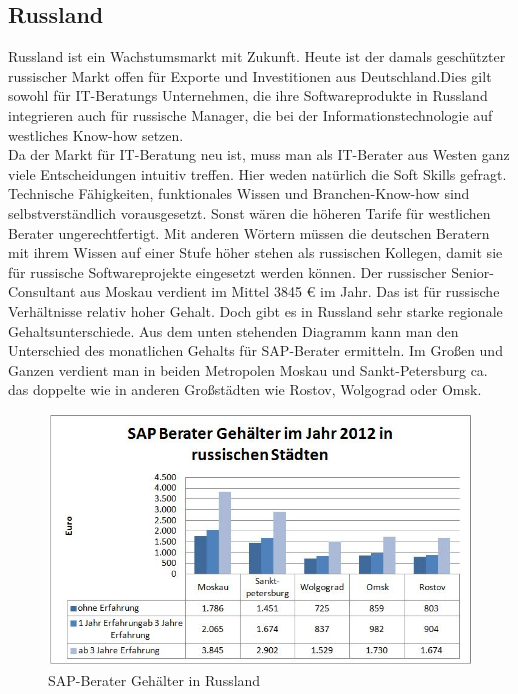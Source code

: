 	\subsection{Russland}
	Russland ist ein Wachstumsmarkt mit Zukunft. Heute ist der damals geschützter russischer Markt offen für Exporte und Investitionen aus Deutschland.Dies gilt sowohl für IT-Beratungs Unternehmen, die ihre Softwareprodukte in Russland integrieren auch für russische Manager, die bei der Informationstechnologie auf westliches Know-how setzen.\\
	Da der Markt für IT-Beratung neu ist, muss man als IT-Berater aus Westen ganz viele Entscheidungen intuitiv treffen. Hier weden natürlich die Soft Skills gefragt. Technische Fähigkeiten, funktionales Wissen und Branchen-Know-how sind selbstverständlich vorausgesetzt. Sonst wären die höheren Tarife für westlichen Berater ungerechtfertigt. Mit anderen Wörtern müssen die deutschen Beratern mit ihrem Wissen auf einer Stufe höher stehen als russischen Kollegen, damit sie für russische Softwareprojekte eingesetzt werden können. 
	Der russischer Senior-Consultant aus Moskau verdient im Mittel 3845 € im Jahr. Das ist für russische Verhältnisse relativ hoher Gehalt. Doch gibt es in Russland sehr starke regionale Gehaltsunterschiede. Aus dem unten stehenden Diagramm kann man den Unterschied des monatlichen 
	Gehalts für SAP-Berater ermitteln. Im Großen und Ganzen verdient man in beiden Metropolen Moskau und Sankt-Petersburg ca. das doppelte wie in anderen Großstädten wie Rostov, Wolgograd oder Omsk.
	\\
\begin{figure}[htp]
\centering
\includegraphics[width=0.7\linewidth]{./images/SAP-Berater_Gehalt_RU}
\caption{SAP-Berater Gehälter in Russland}
\label{fig:SAP-Berater_Gehalt_RU}
\end{figure}

